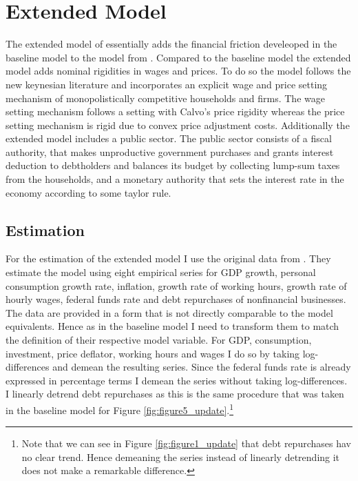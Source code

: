 \section{Extended Model}
\label{sec:extended_model}

The extended model of \textcite{jerman_macroeconomic_2012} essentially
adds the financial friction develeoped in the baseline model to the
model from \textcite{smets_shocks_2007}. Compared to the baseline model the
extended model adds nominal rigidities in wages and prices. To do so the model
follows the new keynesian literature and incorporates an explicit wage and
price setting mechanism of monopolistically competitive households and
firms. The wage setting mechanism follows a setting with Calvo's price
rigidity \parencite{calvo_staggered_1983} whereas the price setting mechanism
is rigid due to convex price adjustment costs. Additionally the extended model
includes a public sector. The public sector consists of a fiscal authority, that
makes unproductive government purchases and grants interest deduction to
debtholders and balances its budget by collecting lump-sum taxes from the
households, and a monetary authority that sets the interest rate in the economy
according to some taylor rule.

\subsection{Estimation}
\label{sec:estimation}

For the estimation of the extended model I use the original data from
\textcite{jerman_macroeconomic_2012}. They estimate the model using eight
empirical series for GDP growth, personal consumption growth rate, inflation,
growth rate of working hours, growth rate of hourly wages, federal funds rate
and debt repurchases of nonfinancial businesses. The data are provided in a
form that is not directly comparable to the model equivalents. Hence as in the
baseline model I need to transform them to match the definition of their
respective model variable. For GDP, consumption, investment, price deflator,
working hours and wages I do so by taking log-differences and demean the
resulting series. Since the federal funds rate is already expressed in
percentage terms I demean the series without taking log-differences. I linearly
detrend debt repurchases as this is the same procedure that was taken in the
baseline model for Figure \ref{fig:figure5_update}.\footnote{Note that we can
  see in Figure \ref{fig:figure1_update} that debt repurchases hav no clear
  trend. Hence demeaning the series instead of linearly detrending it does not
  make a remarkable difference.}

